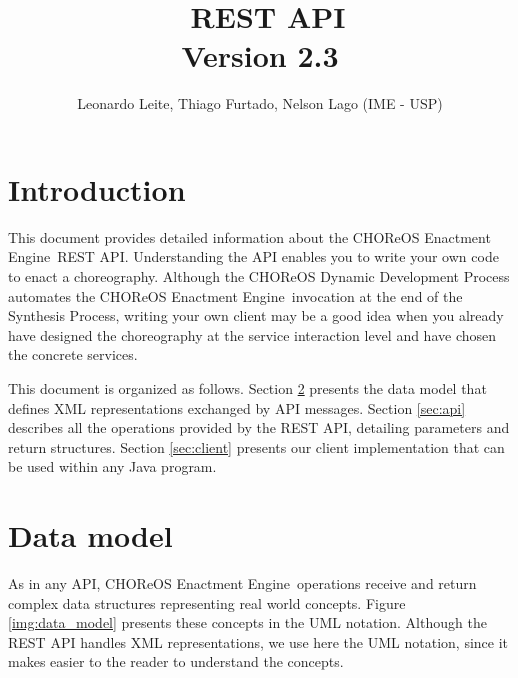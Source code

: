 \documentclass[a4paper, 10pt]{article}
\title{\ee\ REST API \\ {\normalsize Version 2.3}}
\author{Leonardo Leite, Thiago Furtado, Nelson Lago (IME - USP)}
\newcommand{\ee}{CHOReOS Enactment Engine}
\begin{document}
\maketitle

\section{Introduction}

This document provides detailed information about the \ee\ REST API. 
Understanding the API enables you to write your own code to enact a choreography.
Although the CHOReOS Dynamic Development Process automates the \ee\ invocation at the end of the Synthesis Process, writing your own client may be a good idea when you already have designed the choreography at the service interaction level and have chosen the concrete services. 

This document is organized as follows. Section \ref{sec:model} presents the data model that defines XML representations exchanged by API messages. Section \ref{sec:api} describes all the operations provided by the REST API, detailing parameters and return structures. Section \ref{sec:client} presents our client implementation that can be used within any Java program.

\section{Data model}
\label{sec:model}

As in any API, \ee\ operations receive and return complex data structures representing real world concepts. 
Figure \ref{img:data_model} presents these concepts in the UML notation.
Although the REST API handles XML representations, we use here the UML notation, since it makes easier to the reader to understand the concepts.
\end{document}
